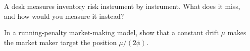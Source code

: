 \begin{interviewq}\label{iq:hf:extensions-of-the-inventory-framework:5}
A desk measures inventory risk instrument by instrument. What does it miss, and how would you measure it instead?
\end{interviewq}

\begin{interviewq}\label{iq:hf:extensions-of-the-inventory-framework:6}
In a running-penalty market-making model, show that a constant drift $\mu$ makes the market maker target the position $\mu/(2\phi)$.
\end{interviewq}
